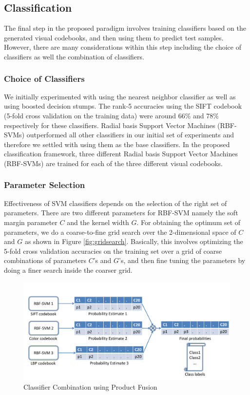 \documentclass[12pt]{article}
\begin{document}
\subsection{Classification}
The final step in the proposed paradigm involves training classifiers based on the generated visual codebooks, and then using them to predict test samples. However, there are many considerations within this step including the choice of classifiers as well the combination of classifiers.

\subsubsection{Choice of Classifiers}
We initially experimented with using the nearest neighbor classifier as well as using boosted decision stumps. The rank-5 accuracies using the SIFT codebook (5-fold cross validation on the training data) were around 66\% and 78\% respectively for these classifiers. Radial basis Support Vector Machines (RBF-SVMs) outperformed all other classifiers in our initial set of experiments and therefore we settled with using them as the base classifiers. In the proposed classification framework, three different Radial basis Support Vector Machines (RBF-SVMs) are trained for each of the three different visual codebooks.

\subsubsection{Parameter Selection}
Effectiveness of SVM classifiers depends on the selection of the right set of parameters. There are two different parameters for RBF-SVM namely the soft margin parameter $C$ and the kernel width $G$. For obtaining the optimum set of parameters, we do a coarse-to-fine grid search over the 2-dimensional space of $C$ and $G$ as shown in Figure \ref{fig:gridsearch}. Basically, this involves optimizing the 5-fold cross validation accuracies on the training set over a grid of coarse combinations of parameters $C$'s and $G$'s, and then fine tuning the parameters by doing a finer search inside the coarser grid.

\begin{figure}
\includegraphics[width = 1\textwidth]{classifiercombination}
\caption{Classifier Combination using Product Fusion}
\label{fig:classifiercombination}
\end{figure}
\end{document}
